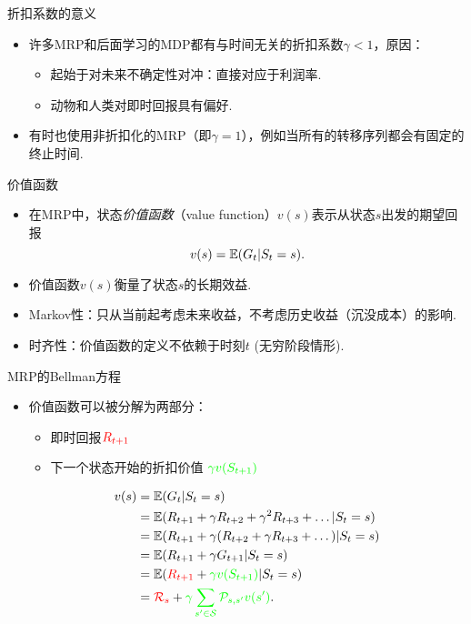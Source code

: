 {折扣系数的意义}
\begin{itemize}
    \item 许多MRP和后面学习的MDP都有与时间无关的折扣系数$\gamma <1$，原因：
\begin{itemize}
    \item 起始于对未来不确定性对冲：直接对应于利润率. 
    \item 动物和人类对即时回报具有偏好.
\end{itemize}
\item 有时也使用非折扣化的MRP（即$\gamma=1$），例如当所有的转移序列都会有固定的终止时间.
\end{itemize}


{价值函数}
\begin{itemize}
    \item 在MRP中，状态\emph{价值函数}（value function）$v(s)$表示从状态$s$出发的期望回报
    \[v(s) = \mathbb{E}(G_t|S_t=s).\]
    \item 价值函数$v(s)$衡量了状态$s$的长期效益.
    \item Markov性：只从当前起考虑未来收益，不考虑历史收益（沉没成本）的影响.
    \item 时齐性：价值函数的定义不依赖于时刻$t$
    (无穷阶段情形).
\end{itemize}



{MRP的Bellman方程}
\begin{itemize}
    \item 价值函数可以被分解为两部分：
\begin{itemize}
    \item 即时回报$\textcolor{red}{R_{t+1}}$
    \item 下一个状态开始的折扣价值 $\textcolor{green}{\gamma v(S_{t+1})}$
\end{itemize}
        \begin{align*}
        v(s) &= \E(G_t|S_t=s) \\
            &= \E(R_{t+1}+ \gamma R_{t+2} + \gamma^2 R_{t+3}+\dots | S_t= s) \\
            &= \E(R_{t+1} + \gamma (R_{t+2}+\gamma R_{t+3}+\dots) | S_t = s) \\
            &= \E(R_{t+1} + \gamma G_{t+1} | S_t = s) \\
            &= \E(\textcolor{red}{R_{t+1}} + \textcolor{green}{\gamma v(S_{t+1})}| S_t=s)\\
            &= {\textcolor{red}{\mathcal R_s} + \textcolor{green}{\gamma \sum_{s'\in \MS}\P_{s,s'}v(s')}}. %
    \end{align*}
\end{itemize}


